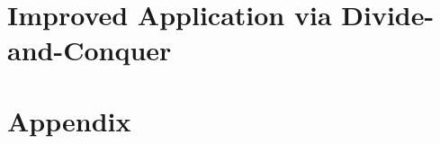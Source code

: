 \documentclass[11pt,letterpaper]{article}
\begin{document}
\section{Improved Application via Divide-and-Conquer}





\appendix
\section{Appendix}\label{sec:appendix}



%
%

\end{document}
